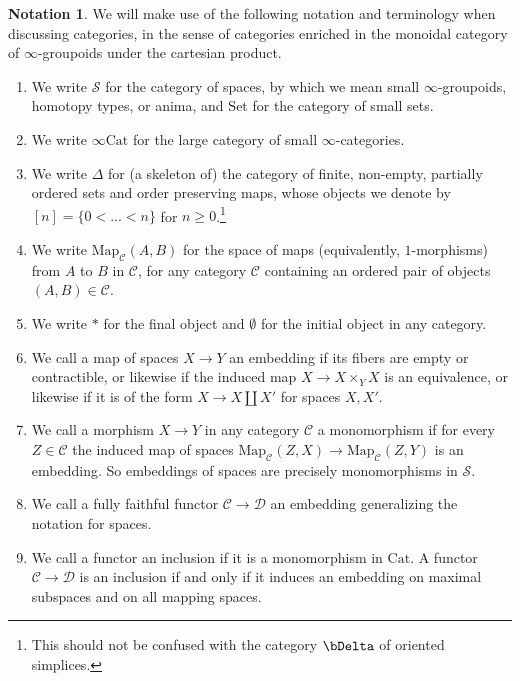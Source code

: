 \documentclass[10pt,oneside]{article}
\numberwithin{equation}{section} %
\numberwithin{figure}{section} %
\theoremstyle{plain}
\theoremstyle{definition}
\newtheorem{notation}[theorem]{Notation}
\newcommand{\mC}{{\mathcal C}}
\newcommand{\mD}{{\mathcal D}}
\newcommand{\mS}{{\mathcal S}}
\newcommand{\n}{{n}}
\newcommand{\Cat}{\mathrm{Cat}}
\newcommand{\Set}{\mathrm{Set}}
\newcommand{\Map}{{\mathrm{Map}}}
\begin{document}
\begin{notation}
We will make use of the following notation and terminology when discussing categories, in the sense of categories enriched in the monoidal category of $\infty$-groupoids under the cartesian product.
\begin{enumerate}[\normalfont(1)]\setlength{\itemsep}{-2pt}
\item We write $\mS$ for the category of spaces, by which we mean small $\infty$-groupoids, homotopy types, or anima, and $\Set$ for the category of small sets.
\item We write $\infty\Cat$ for the large category of small $\infty$-categories.

\item We write $\Delta$ for (a skeleton of) the category of finite, non-empty, partially ordered sets and order preserving maps, whose objects we denote by $[\n] = \{0 < ... < \n\}$ for $\n \geq 0$.\footnote{This should not be confused with the category $\bDelta$ of oriented simplices.}
\item We write $\Map_{\mC}(A,B)$ for the space of maps (equivalently, $1$-morphisms) from $A$ to $B$ in $\mC$, for any category $\mC$ containing an ordered pair of objects $(A,B)\in\mC$.

\item We write $\ast$ for the final object and
$\emptyset$ for the initial object in any category.

\item We call a map of spaces $X \to Y$ an embedding if its fibers are empty or contractible, or likewise if the induced map $X \to X \times_Y X$ is an equivalence, or likewise if it is of the form $X \to X \coprod X'$ for spaces $X,X'.$ 

\item We call a morphism $X \to Y$ in any category $\mC$ a monomorphism if for every $Z \in \mC$ the induced map of spaces $\Map_\mC(Z,X) \to \Map_\mC(Z,Y) $ is an embedding. So embeddings of spaces are precisely monomorphisms in $\mS.$ 

\item We call a fully faithful functor $\mC \to \mD$ an embedding generalizing the notation for spaces.

\item We call a functor an inclusion if it is a monomorphism in $\Cat$. A functor $\mC \to \mD$ is an inclusion if and only if it induces an embedding on maximal subspaces and on all mapping spaces. 


\end{enumerate}
\end{notation}
\end{document}
